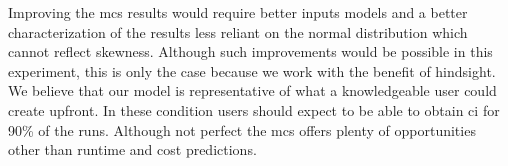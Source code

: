 \documentclass[10pt,conference,compsocconf]{IEEEtran}
\begin{document}
Improving the \ac{mcs} results would require better inputs models and a better
characterization of the results less reliant on the normal distribution which
cannot reflect skewness. Although such improvements would be possible in this
experiment, this is only the case because we work with the benefit of hindsight.
We believe that our model is representative of what a knowledgeable user could
create upfront. In these condition users should expect to be able to obtain
\ac{ci} for 90\% of the runs. Although not perfect the \ac{mcs} offers plenty of
opportunities other than runtime and cost predictions.

\end{document}
